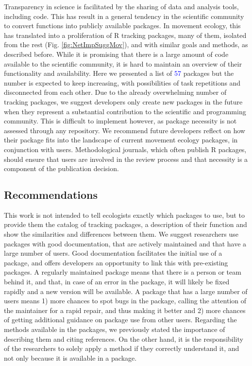\documentclass[a4paper,12pt]{article}
\begin{document}
Transparency in science is facilitated by the sharing of data and analysis tools, including code. This has result in a general tendency in the scientific community to convert functions into publicly available packages. In movement ecology, this has translated into a proliferation of R tracking packages, many of them, isolated from the rest (Fig. \ref{fig:NetImpSuggMov}), and with similar goals and methods, as described before. While it is promising that there is a large amount of code available to the scientific community, it is hard to maintain an overview of their functionality and availability. Here we presented a list of \textcolor{blue}{57} packages but the number is expected to keep increasing, with possibilities of task repetitions and disconnected from each other. Due to the already overwhelming number of tracking packages, we suggest developers only create new packages in the future when they represent a substantial contribution to the scientific and programming community. This is difficult to implement however, as package necessity is not assessed through any repository. We recommend future developers reflect on how their package fits into the landscape of current movement ecology packages, in conjunction with users. Methodological journals, which often publish R packages, should ensure that users are involved in the review process and that necessity is a component of the publication decision.

\subsection*{Recommendations}

This work is not intended to tell ecologists exactly which packages to use, but to provide them the catalog of tracking packages, a description of their function and show the similarities and differences between them. We suggest researchers use packages with good documentation, that are actively maintained and that have a large number of users. Good documentation facilitates the initial use of a package, and offers developers an opportunity to link this with pre-existing packages. A regularly maintained package means that there is a person or team behind it, and that, in case of an error in the package, it will likely be fixed rapidly and a new version will be available. A package that has a large number of users means 1) more chances to spot bugs in the package, calling the attention of the maintainer for a rapid repair, and thus making it better and 2) more chances of getting additional guidance on package use from other users. Regarding the methods available in the packages, we previously stated the importance of describing them and citing references. On the other hand, it is the responsibility of the researchers to solely apply a method if they correctly understand it, and not only because it is available in a package. 
\end{document}
